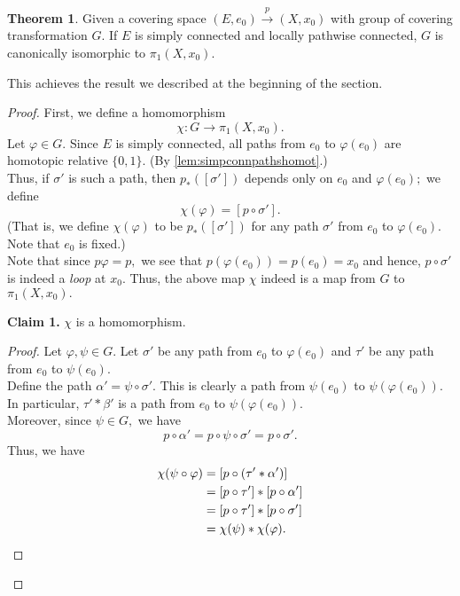 \documentclass[12pt]{article}
\theoremstyle{definition}
\newtheorem{thm}{Theorem}
\numberwithin{thm}{section}
\newenvironment{blockquote}
{\begin{mdframed}[skipabove=0pt, skipbelow=0pt, innertopmargin=4pt, innerbottommargin=4pt, bottomline=false,topline=false,rightline=false, linewidth=2pt]}
{\end{mdframed}}
\begin{document}
\begin{thm}
	Given a covering space $(E, e_0) \overset{p}{\longrightarrow} (X, x_0)$ with group of covering transformation $G.$ If $E$ is simply connected and locally pathwise connected, $G$ is canonically isomorphic to $\pi_1(X, x_0).$
\end{thm}
This achieves the result we described at the beginning of the section.
\begin{proof} 
	First, we define a homomorphism 
	\begin{equation*} 
		\chi:G \to \pi_1(X, x_0).
	\end{equation*}
	Let $\varphi \in G.$ Since $E$ is simply connected, all paths from $e_0$ to $\varphi(e_0)$ are homotopic relative $\{0, 1\}.$ (By \cref{lem:simpconnpathshomot}.)\\
	Thus, if $\sigma'$ is such a path, then $p_*([\sigma'])$ depends only on $e_0$ and $\varphi(e_0);$ we define
	\begin{equation*} 
		\chi(\varphi) = [p \circ \sigma'].
	\end{equation*}
	(That is, we define $\chi(\varphi)$ to be $p_*([\sigma'])$ for any path $\sigma'$ from $e_0$ to $\varphi(e_0).$ Note that $e_0$ is fixed.)\\
	Note that since $p\varphi = p,$ we see that $p(\varphi(e_0)) = p(e_0) = x_0$ and hence, $p\circ \sigma'$ is indeed a \emph{loop} at $x_0.$ Thus, the above map $\chi$ indeed is a map from $G$ to $\pi_1(X, x_0).$\\
	
	\begin{blockquote}
		\textbf{Claim 1.} $\chi$ is a homomorphism.
		\begin{proof} 
			Let $\varphi, \psi \in G.$ Let $\sigma'$ be any path from $e_0$ to $\varphi(e_0)$ and $\tau'$ be any path from $e_0$ to $\psi(e_0).$\\
			Define the path $\alpha' = \psi\circ\sigma'.$ This is clearly a path from $\psi(e_0)$ to $\psi(\varphi(e_0)).$ In particular, $\tau'*\beta'$ is a path from $e_0$ to $\psi(\varphi(e_0)).$ \\
			Moreover, since $\psi \in G,$ we have
			\begin{equation*} 
				p\circ\alpha' = p\circ\psi\circ\sigma' = p\circ\sigma'.
			\end{equation*}
			Thus, we have
			\begin{align*} 
				\chi(\psi\circ\varphi) &= [p\circ(\tau'*\alpha')]\\
				&=[p\circ\tau']*[p\circ\alpha']\\
				&=[p\circ\tau']*[p\circ\sigma']\\
				&=\chi(\psi)*\chi(\varphi). \qedhere
			\end{align*}
		\end{proof}
	\end{blockquote}


\end{proof}
\end{document}
